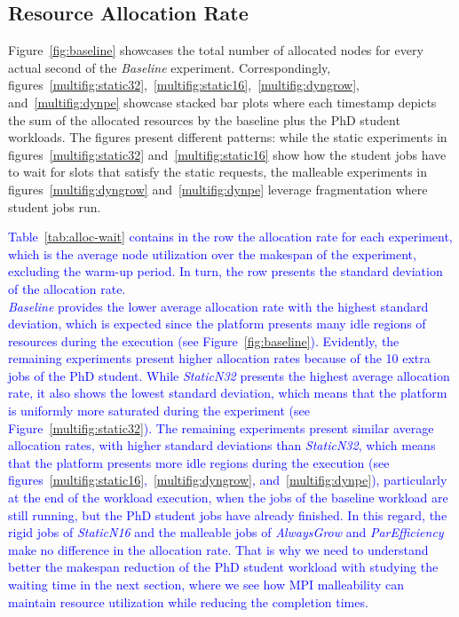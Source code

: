 \documentclass[a4paper,fleqn]{cas-dc}
\newcommand{\review}[1]{\textcolor{blue}{#1}}
\begin{document}
\subsection{Resource Allocation Rate}\label{subsec:utilization}
Figure~\ref{fig:baseline} showcases the total number of allocated nodes for every actual second of the \textit{Baseline} experiment.
Correspondingly, figures~\ref{multifig:static32},~\ref{multifig:static16},~\ref{multifig:dyngrow}, and~\ref{multifig:dynpe} showcase stacked bar plots where each timestamp depicts the sum of the allocated resources by the baseline plus the PhD student workloads.
The figures present different patterns: while the static experiments in figures~\ref{multifig:static32} and~\ref{multifig:static16} show how the student jobs have to wait for slots that satisfy the static requests, the malleable experiments in figures~\ref{multifig:dyngrow} and~\ref{multifig:dynpe} leverage fragmentation where student jobs run.

\review{
Table~\ref{tab:alloc-wait} contains in the  row the allocation rate for each experiment, which is the average node utilization over the makespan of the experiment, excluding the warm-up period.
In turn, the \nth{5} row presents the standard deviation of the allocation rate.
\\\indent
\textit{Baseline} provides the lower average allocation rate with the highest standard deviation, which is expected since the platform presents many idle regions of resources during the execution (see Figure~\ref{fig:baseline}).
Evidently, the remaining experiments present higher allocation rates because of the 10 extra jobs of the PhD student.
While \textit{StaticN32} presents the highest average allocation rate, it also shows the lowest standard deviation, which means that the platform is uniformly more saturated during the experiment (see Figure~\ref{multifig:static32}).
The remaining experiments present similar average allocation rates, with higher standard deviations than \textit{StaticN32}, which means that the platform presents more idle regions during the execution (see figures~\ref{multifig:static16},~\ref{multifig:dyngrow}, and~\ref{multifig:dynpe}), particularly at the end of the workload execution, when the jobs of the baseline workload are still running, but the PhD student jobs have already finished.
In this regard, the rigid jobs of \textit{StaticN16} and the malleable jobs of \textit{AlwaysGrow} and \textit{ParEfficiency} make no difference in the allocation rate.
That is why we need to understand better the makespan reduction of the PhD student workload with studying the waiting time in the next section, where we see how MPI malleability can maintain resource utilization while reducing the completion times.
}
\end{document}
